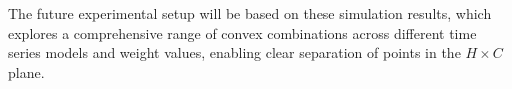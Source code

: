 \documentclass[12pt,a4paper]{article}
\newcommand{\convexBase}{../../../Results/Convex_combination}
\begin{document}


The future experimental setup will be based on these simulation results, which explores a comprehensive range of convex combinations across different time series models and weight values, enabling clear separation of points in the $H \times C$ plane.

		
		
		
		
\end{document}
